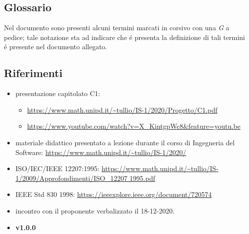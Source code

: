\subsection{Glossario}
Nel documento sono presenti alcuni termini marcati in corsivo con una \emph{G} a pedice; tale notazione sta ad indicare che \'{e} presenta la definizione di tali termini \'{e} presente nel documento \Gv{} allegato.

\subsection{Riferimenti}
\begin{itemize}
    \item presentazione capitolato C1:
    \begin{itemize} 
        \item \url{https://www.math.unipd.it/~tullio/IS-1/2020/Progetto/C1.pdf}
        \item \url{https://www.youtube.com/watch?v=X_KintgpWc8&feature=youtu.be}
    \end{itemize}
    \item materiale didattico presentato a lezione durante il corso di Ingegneria del Software: \url{https://www.math.unipd.it/~tullio/IS-1/2020/}
    \item ISO/IEC/IEEE 12207:1995: \url{https://www.math.unipd.it/~tullio/IS-1/2009/Approfondimenti/ISO_12207 1995.pdf}
    \item IEEE Std 830 1998: \url{https://ieeexplore.ieee.org/document/720574}
    \item incontro con il proponente verbalizzato il 18-12-2020.
    \item \textbf{\NdP} \textbf{v1.0.0}
\end{itemize}
